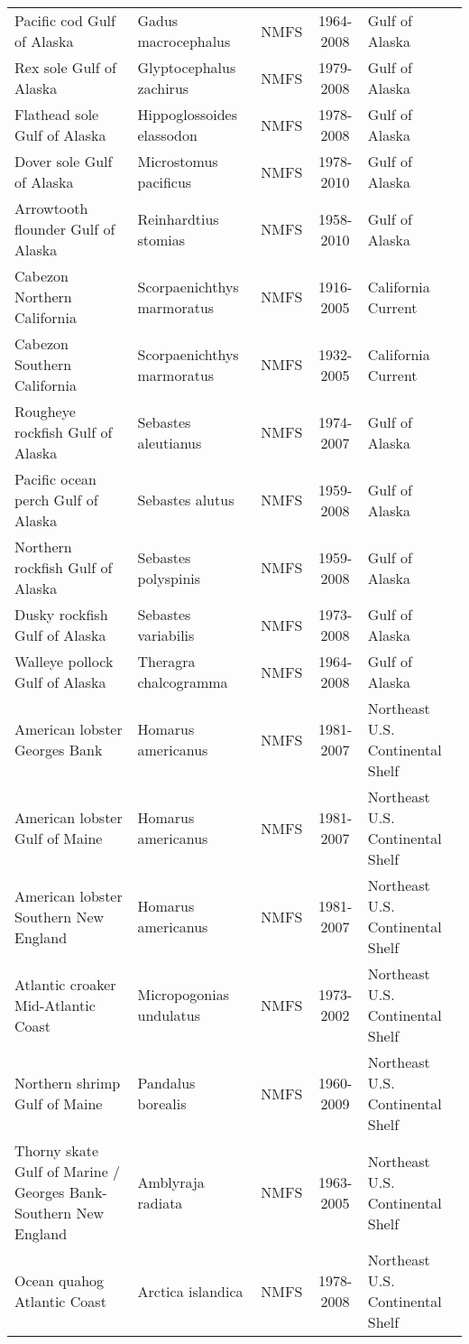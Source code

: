 \begin{longtable}{p{4cm}p{3.5cm}ccp{5.5cm}}
  Pacific cod Gulf of Alaska & Gadus macrocephalus & NMFS & 1964-2008 & Gulf of Alaska \\ 
  Rex sole Gulf of Alaska & Glyptocephalus zachirus & NMFS & 1979-2008 & Gulf of Alaska \\ 
  Flathead sole Gulf of Alaska & Hippoglossoides elassodon & NMFS & 1978-2008 & Gulf of Alaska \\ 
  Dover sole Gulf of Alaska & Microstomus pacificus & NMFS & 1978-2010 & Gulf of Alaska \\ 
  Arrowtooth flounder Gulf of Alaska & Reinhardtius stomias & NMFS & 1958-2010 & Gulf of Alaska \\ 
  Cabezon Northern California & Scorpaenichthys marmoratus & NMFS & 1916-2005 & California Current \\ 
  Cabezon Southern California & Scorpaenichthys marmoratus & NMFS & 1932-2005 & California Current \\ 
  Rougheye rockfish Gulf of Alaska & Sebastes aleutianus & NMFS & 1974-2007 & Gulf of Alaska \\ 
  Pacific ocean perch Gulf of Alaska & Sebastes alutus & NMFS & 1959-2008 & Gulf of Alaska \\ 
  Northern rockfish Gulf of Alaska & Sebastes polyspinis & NMFS & 1959-2008 & Gulf of Alaska \\ 
  Dusky rockfish Gulf of Alaska & Sebastes variabilis & NMFS & 1973-2008 & Gulf of Alaska \\ 
  Walleye pollock Gulf of Alaska & Theragra chalcogramma & NMFS & 1964-2008 & Gulf of Alaska \\ 
  American lobster Georges Bank & Homarus americanus & NMFS & 1981-2007 & Northeast U.S. Continental Shelf \\ 
  American lobster Gulf of Maine & Homarus americanus & NMFS & 1981-2007 & Northeast U.S. Continental Shelf \\ 
  American lobster Southern New England & Homarus americanus & NMFS & 1981-2007 & Northeast U.S. Continental Shelf \\ 
  Atlantic croaker Mid-Atlantic Coast & Micropogonias undulatus & NMFS & 1973-2002 & Northeast U.S. Continental Shelf \\ 
  Northern shrimp Gulf of Maine & Pandalus borealis & NMFS & 1960-2009 & Northeast U.S. Continental Shelf \\ 
  Thorny skate Gulf of Marine / Georges Bank-Southern New England & Amblyraja radiata & NMFS & 1963-2005 & Northeast U.S. Continental Shelf \\ 
  Ocean quahog Atlantic Coast & Arctica islandica & NMFS & 1978-2008 & Northeast U.S. Continental Shelf \\ 

\end{longtable}
